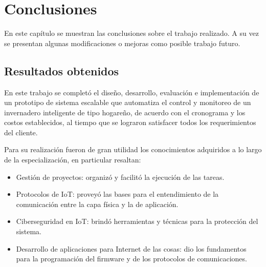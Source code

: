 
\chapter{Conclusiones} %

\label{Chapter5} %





En este capítulo se muestran las conclusiones sobre el trabajo realizado. A su vez
se presentan algunas modificaciones o mejoras como posible trabajo futuro.
\section{Resultados obtenidos }


En este trabajo se completó el diseño, desarrollo, evaluación e implementación de un
prototipo de sistema escalable que automatiza el control y monitoreo de un invernadero inteligente de tipo hogareño, de acuerdo con el cronograma y los costos establecidos, al tiempo que se lograron satisfacer todos los requerimientos del cliente.

Para su realización fueron de gran utilidad los conocimientos adquiridos a lo largo de la especialización, en particular resaltan:
\begin{itemize}
\item Gestión de proyectos: organizó y facilitó la ejecución de las tareas.
\item Protocolos de IoT: proveyó las bases para el entendimiento de la comunicación entre la capa física y la de aplicación.
\item Ciberseguridad en IoT: brindó herramientas y técnicas para la protección del sistema.
\item Desarrollo de aplicaciones para Internet de las cosas: dio los fundamentos para la programación del firmware y de los protocolos de comunicaciones. 
\end{itemize}



